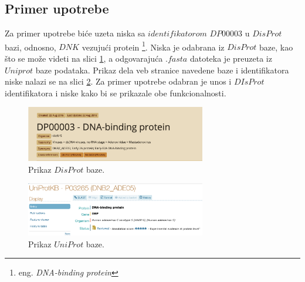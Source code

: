 \subsection{Primer upotrebe}
Za primer upotrebe biće uzeta niska sa $identifikatorom$ $DP00003$ u $DisProt$ bazi, odnosno, $DNK$ vezujući protein \footnote{eng. \em{DNA-binding protein}}. 
Niska je odabrana iz $DisProt$ baze, kao što se može videti na slici \ref{fig:DisProt}, a odgovarajuća $.fasta$ datoteka je preuzeta iz $Uniprot$ baze podataka. Prikaz dela veb stranice navedene baze i identifikatora niske nalazi se na slici \ref{fig:UniProt}. Za primer upotrebe odabran je unos i $DIsProt$ identifikatora i niske kako bi se prikazale obe funkcionalnosti.

\begin{figure}[H]
	\centering
    \includegraphics[width=0.7\textwidth]{Figures/App/DisProt.png}
    \caption{Prikaz $DisProt$ baze.}
    \label{fig:DisProt}
\end{figure}

\begin{figure}[H]
	\centering
    \includegraphics[width=0.7\textwidth]{Figures/App/UniProt.png}
    \caption{Prikaz $UniProt$ baze.}
    \label{fig:UniProt}
\end{figure}

